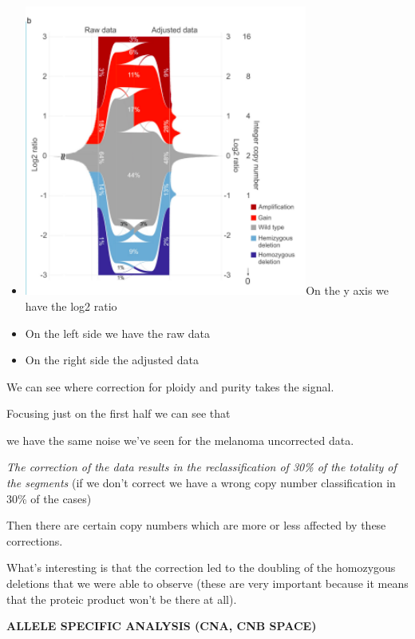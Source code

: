 \begin{itemize}
\item
  \includegraphics[width=3.65972in,height=3.76389in]{image10.png}On the y axis
  we have the log2 ratio
\item
  On the left side we have the raw data
\item
  On the right side the adjusted data
\end{itemize}

We can see where correction for ploidy and purity takes the signal.

Focusing just on the first half we can see that

we have the same noise we've seen for the melanoma uncorrected data.

\emph{The correction of the data results in the reclassification of 30\% of the
totality of the segments} (if we don't correct we have a wrong copy number
classification in 30\% of the cases)

Then there are certain copy numbers which are more or less affected by these
corrections.

What's interesting is that the correction led to the doubling of the homozygous
deletions that we were able to observe (these are very important because it
means that the proteic product won't be there at all).

\textbf{ALLELE SPECIFIC ANALYSIS (CNA, CNB SPACE)}

